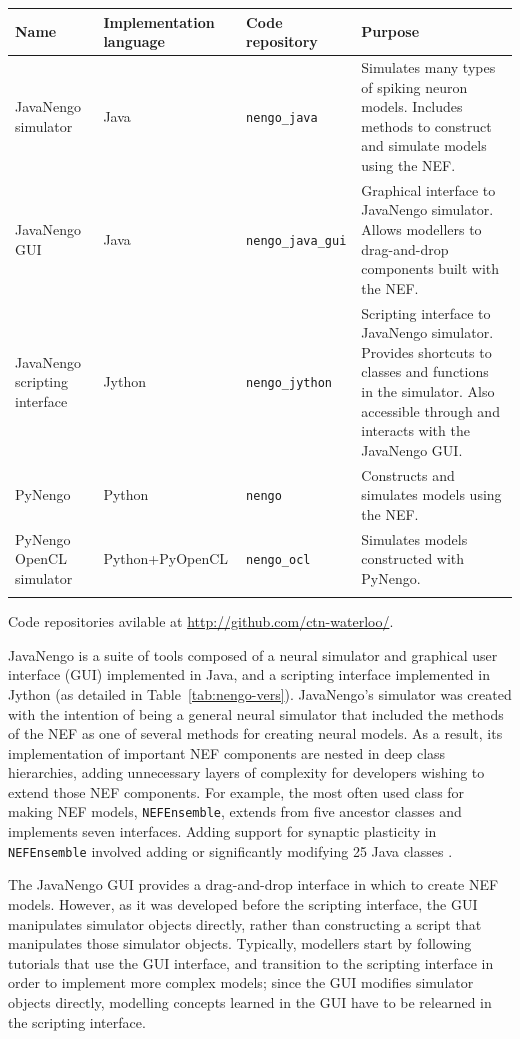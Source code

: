 \documentclass{frontiersSCNS}
\begin{document}
\begin{table}[!t]
{\begin{tabular}{p{2.6cm} p{2.7cm} l p{7cm}} \toprule
\textbf{Name} & \textbf{Implementation language}
  & \textbf{Code repository} & \textbf{Purpose} \\\midrule
JavaNengo simulator & Java & \texttt{nengo\_java}
  & Simulates many types of spiking neuron models.
  Includes methods to construct and simulate models using the NEF. \\
JavaNengo GUI & Java & \texttt{nengo\_java\_gui}
  & Graphical interface to JavaNengo simulator.
  Allows modellers to drag-and-drop components built with the NEF. \\
JavaNengo scripting interface & Jython & \texttt{nengo\_jython}
  & Scripting interface to JavaNengo simulator.
  Provides shortcuts to classes and functions in the simulator.
  Also accessible through and interacts with the JavaNengo GUI. \\
PyNengo & Python & \texttt{nengo}
  & Constructs and simulates models using the NEF. \\
PyNengo OpenCL simulator & Python+PyOpenCL
  & \texttt{nengo\_ocl}
  & Simulates models constructed with PyNengo. \\\botrule
\end{tabular}}{Code repositories avilable at \url{http://github.com/ctn-waterloo/}.}
\end{table}

JavaNengo is a suite of tools composed of
a neural simulator and graphical user interface (GUI)
implemented in Java,
and a scripting interface implemented in Jython
(as detailed in Table~\ref{tab:nengo-vers}).
JavaNengo's simulator was created
with the intention of being a general
neural simulator that included
the methods of the NEF
as one of several
methods for creating neural models.
As a result, its implementation
of important NEF components
are nested in deep class hierarchies,
adding unnecessary layers of complexity
for developers wishing
to extend those NEF components.
For example,
the most often used class for making
NEF models, \texttt{NEFEnsemble},
extends from five ancestor classes
and implements seven interfaces.
Adding support for synaptic plasticity
in \texttt{NEFEnsemble}
involved adding or significantly modifying
25 Java classes \cite{TODO}.

The JavaNengo GUI provides
a drag-and-drop interface in which to create NEF models.
However, as it was developed
before the scripting interface,
the GUI manipulates simulator objects directly,
rather than constructing a script
that manipulates those simulator objects.
Typically, modellers start by following
tutorials that use the GUI interface,
and transition to the scripting interface
in order to implement more complex models;
since the GUI modifies simulator objects directly,
modelling concepts learned in the GUI
have to be relearned in the scripting interface.
\end{document}
